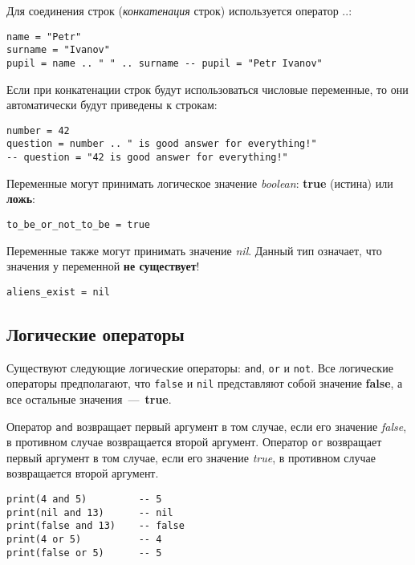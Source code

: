 Для соединения строк (\emph{конкатенация} строк) используется оператор $..$:

\begin{lstlisting}
name = "Petr"
surname = "Ivanov"
pupil = name .. " " .. surname -- pupil = "Petr Ivanov"
\end{lstlisting}

Если при конкатенации строк будут использоваться числовые переменные, то они автоматически будут приведены к строкам:

\begin{lstlisting}
number = 42
question = number .. " is good answer for everything!"
-- question = "42 is good answer for everything!"
\end{lstlisting}

Переменные могут принимать логическое значение \emph{boolean}: \textbf{true} (истина) или \textbf{ложь}:

\begin{lstlisting}
to_be_or_not_to_be = true
\end{lstlisting}

Переменные также могут принимать значение \emph{nil}. Данный тип означает, что значения у переменной \textbf{не существует}!

\begin{lstlisting}
aliens_exist = nil
\end{lstlisting}

\subsection{Логические операторы}

Существуют следующие логические операторы: \lstinline{and}, \lstinline{or} и \lstinline{not}.
Все логические операторы предполагают, что \lstinline{false} и \lstinline{nil} представляют собой значение \textbf{false}, 
а все остальные значения~---~\textbf{true}.

Оператор \lstinline{and} возвращает первый аргумент в том случае, если его значение \emph{false}, 
в противном случае возвращается второй аргумент.
Оператор \lstinline{or} возвращает  первый аргумент в том случае, если его значение \emph{true},
в противном случае возвращается второй аргумент.

\begin{lstlisting}
print(4 and 5)         -- 5
print(nil and 13)      -- nil
print(false and 13)    -- false
print(4 or 5)          -- 4
print(false or 5)      -- 5
\end{lstlisting}

